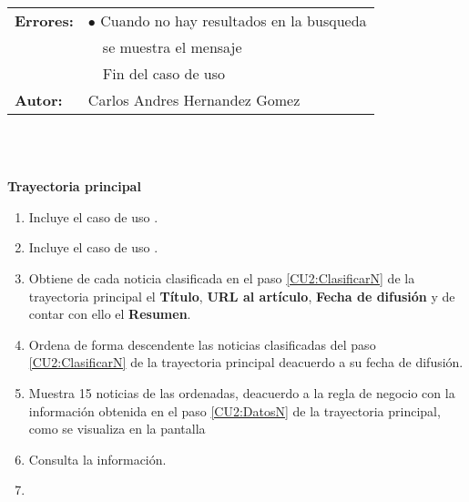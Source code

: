 \begin{tabular}{|l|l|}
	\textbf{Errores:} &$\bullet$\TError{CU2}{Uno} Cuando no hay resultados en la busqueda\\
	&\ \ se muestra el mensaje \Tref{MSG2}{MSG2 Petición vacía}\\
	&\ \ Fin del caso de uso\\
	\hline

	\textbf{Autor:} & Carlos Andres Hernandez Gomez \\
	\hline
\end{tabular}\\\\



\begin{large}
	\textbf{Trayectoria principal}\\
\end{large}	

\begin{enumerate}[1.]


	\item \label{CU2:BuscarN}\sistema Incluye el caso de uso .

	\item \sistema \label{CU2:ClasificarN}Incluye el caso de uso .

	\item \sistema \label{CU2:DatosN}Obtiene de cada noticia clasificada en el paso \ref{CU2:ClasificarN} de la trayectoria principal el \textbf{Título}, \textbf{URL al artículo}, \textbf{Fecha de difusión} y de contar con ello el \textbf{Resumen}.

	\item \sistema \label{CU2:OrdenaN}Ordena de forma descendente las noticias clasificadas del paso \ref{CU2:ClasificarN} de la trayectoria principal deacuerdo a su fecha de difusión.

	\item \sistema Muestra 15 noticias de las ordenadas, deacuerdo a la regla de negocio  con la información obtenida en el paso \ref{CU2:DatosN} de la trayectoria principal, como se visualiza en la pantalla  

	\item \actor \label{CU2:Consulta}Consulta la información.

	\item \finCU	
\end{enumerate}


